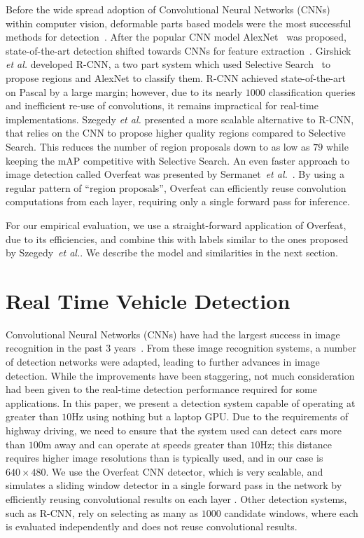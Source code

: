 \documentclass[journal]{IEEEtran}
\begin{document}
Before the wide spread adoption of Convolutional Neural Networks (CNNs) within computer vision, deformable parts based models were the most successful methods for detection~\cite{felzenszwalb-2010}. After the popular CNN model AlexNet~\cite{krizhevsky-2012} was proposed, state-of-the-art detection shifted towards CNNs for feature extraction~\cite{sermanet-2013,szegedy-2014,szegedy-2013,girshick-2014}. Girshick \textit{et al.} developed R-CNN, a two part system which used Selective Search~\cite{uijlings-2013} to propose regions and AlexNet to classify them. R-CNN achieved state-of-the-art on Pascal by a large margin; however, due to its nearly $1000$ classification queries and inefficient re-use of convolutions, it remains impractical for real-time implementations. Szegedy \textit{et al.} presented a more scalable alternative to R-CNN, that relies on the CNN to propose higher quality regions compared to Selective Search. This reduces the number of region proposals down to as low as $79$ while keeping the mAP competitive with Selective Search. An even faster approach to image detection called Overfeat was presented by Sermanet~\textit{et al.}~\cite{sermanet-2013}. By using a regular pattern of ``region proposals'', Overfeat can efficiently reuse convolution computations from each layer, requiring only a single forward pass for inference.  
 
For our empirical evaluation, we use a straight-forward application of Overfeat, due to its efficiencies, and combine this with labels similar to the ones proposed by Szegedy~\textit{et al.}. We describe the model and similarities in the next section. 
 
\section{Real Time Vehicle Detection}
Convolutional Neural Networks (CNNs) have had the largest success in image recognition in the past 3 years~\cite{krizhevsky-2012,szegedy-2014-inception,he-2015,simonyan-2014}. From these image recognition systems, a number of detection networks were adapted, leading to further advances in image detection. While the improvements have been staggering, not much consideration had been given to the real-time detection performance required for some applications. In this paper, we present a detection system capable of operating at greater than $10$Hz using nothing but a laptop GPU. Due to the requirements of highway driving, we need to ensure that the system used can detect cars more than $100$m away and can operate at speeds greater than $10$Hz; this distance requires higher image resolutions than is typically used, and in our case is $640 \times 480$. We use the Overfeat CNN detector, which is very scalable, and simulates a sliding window detector in a single forward pass in the network by efficiently reusing convolutional results on each layer \cite{sermanet-2013}. Other detection systems, such as R-CNN, rely on selecting as many as $1000$ candidate windows, where each is evaluated independently and does not reuse convolutional results. 
\end{document}
